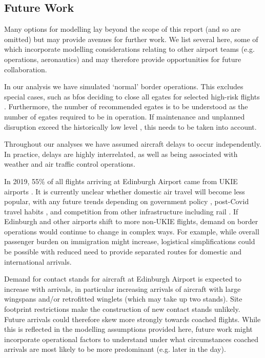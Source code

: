 \documentclass[10pt]{article}
\begin{document}
\vspace{10pt}

\subsection{Future Work}
Many options for modelling lay beyond the scope of this report (and so are omitted) but may provide avenues for further work. We list several here, some of which incorporate modelling considerations relating to other airport teams (e.g. operations, aeronautics) and may therefore provide opportunities for future collaboration.

In our analysis we have simulated `normal' border operations. This excludes special cases, such as \glspl{bfo} deciding to close all \glspl{egate} for selected high-risk flights \cite{Inspection_eGates}.  Furthermore, the number of recommended \glspl{egate} is to be understood as the number of \glspl{egate} required to be in operation. If maintenance and unplanned disruption exceed the historically low level \cite{Inspection_eGates}, this needs to be taken into account.

Throughout our analyses we have assumed aircraft delays to occur independently. In practice, delays are highly interrelated, as well as being associated with weather and air traffic control operations.

In 2019, 55\% of all flights arriving at Edinburgh Airport came from UKIE airports \cite{noise_lab}. It is currently unclear whether domestic air travel will become less popular, with any future trends depending on government policy \cite{flight_tax_independent}, post-Covid travel habits \cite{post_covid_flights}, and competition from other infrastructure including rail \cite{train_airplane_guardian}. If Edinburgh and other airports shift to more non-UKIE flights, demand on border operations would continue to change in complex ways. For example, while overall passenger burden on immigration might increase, logistical simplifications could be possible with reduced need to provide separated routes for domestic and international arrivals.

Demand for contact stands for aircraft at Edinburgh Airport is expected to increase with arrivals, in particular increasing arrivals of aircraft with large wingspans and/or retrofitted winglets (which may take up two stands). Site footprint restrictions make the construction of new contact stands unlikely. Future arrivals could therefore skew more strongly towards coached flights. While this is reflected in the modelling assumptions provided here, future work might incorporate operational factors to understand under what circumstances coached arrivals are most likely to be more predominant (e.g. later in the day). 
\end{document}
